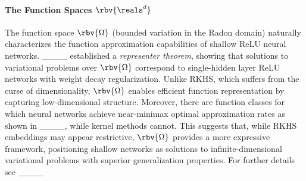 
\paragraph{The Function Spaces $\rbv{\reals^d}$} The function space \(\rbv{\Omega}\) (bounded variation in the Radon domain) naturally characterizes the function approximation capabilities of shallow ReLU neural networks. ____ established a \textit{representer theorem}, showing that solutions to variational problems over \(\rbv{\Omega}\) correspond to single-hidden layer ReLU networks with weight decay regularization. Unlike RKHS, which suffers from the curse of dimensionality, \(\rbv{\Omega}\) enables efficient function representation by capturing low-dimensional structure. %
Moreover, there are function classes for which neural networks achieve near-minimax optimal approximation rates as shown in ____, while kernel methods cannot. This suggests that, while RKHS embeddings may appear restrictive, \(\rbv{\Omega}\) provides a more expressive framework, positioning shallow networks as solutions to infinite-dimensional variational problems with superior generalization properties. %
For further details see ____

